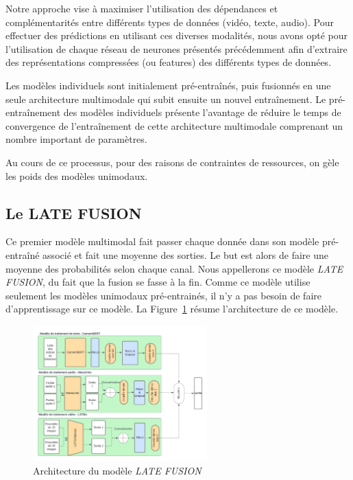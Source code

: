 Notre approche vise à maximiser l'utilisation des dépendances et complémentarités entre différents types de données (vidéo, texte,
audio). Pour effectuer des prédictions en utilisant ces diverses modalités, nous avons opté pour l'utilisation de chaque réseau de
neurones présentés précédemment afin d'extraire des représentations compressées (ou features) des différents types de données. 

Les modèles individuels sont initialement pré-entraînés, puis fusionnés en une seule architecture multimodale qui subit ensuite un
nouvel entraînement. Le pré-entraînement des modèles individuels présente l'avantage de réduire le temps de convergence de
l'entraînement de cette architecture multimodale comprenant un nombre important de paramètres.

Au cours de ce processus, pour des raisons de contraintes de ressources, on gèle les poids des modèles unimodaux.

\subsection{Le LATE FUSION}
Ce premier modèle multimodal fait passer chaque donnée dans son modèle pré-entraîné associé et fait une moyenne des sorties. Le but
est alors de faire une moyenne des probabilités selon chaque canal. Nous appellerons ce modèle \textit{LATE FUSION}, du fait que la 
fusion se fasse à la fin. Comme ce modèle utilise seulement les modèles unimodaux pré-entrainés, il n'y a pas besoin de faire 
d'apprentissage sur ce modèle.
La Figure~\ref{fig: LATE FUSION} résume l'architecture de ce modèle.

\begin{figure}[H]
    \centering
    \includegraphics[width=0.6\textwidth]{image_model/late_fusion.png}
    \caption{Architecture du modèle \textit{LATE FUSION}}
    \label{fig: LATE FUSION}
\end{figure}

